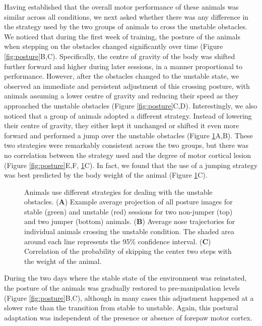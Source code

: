 Having established that the overall motor performance of these animals was similar across all conditions, we next asked whether there was any difference in the strategy used by the two groups of animals to cross the unstable obstacles. We noticed that during the first week of training, the posture of the animals when stepping on the obstacles changed significantly over time (Figure \ref{fig:posture}B,C). Specifically, the centre of gravity of the body was shifted further forward and higher during later sessions, in a manner proportional to performance. However, after the obstacles changed to the unstable state, we observed an immediate and persistent adjustment of this crossing posture, with animals assuming a lower centre of gravity and reducing their speed as they approached the unstable obstacles (Figure \ref{fig:posture}C,D). Interestingly, we also noticed that a group of animals adopted a different strategy. Instead of lowering their centre of gravity, they either kept it unchanged or shifted it even more forward and performed a jump over the unstable obstacles (Figure \ref{fig:jumping}A,B). These two strategies were remarkably consistent across the two groups, but there was no correlation between the strategy used and the degree of motor cortical lesion (Figure \ref{fig:posture}E,F, \ref{fig:jumping}C). In fact, we found that the use of a jumping strategy was best predicted by the body weight of the animal (Figure \ref{fig:jumping}C).

\begin{figure}
\centering

\caption{Animals use different strategies for dealing with the unstable obstacles. (\textbf{A}) Example average projection of all posture images for stable (green) and unstable (red) sessions for two non-jumper (top) and two jumper (bottom) animals. (\textbf{B}) Average nose trajectories for individual animals crossing the unstable condition. The shaded area around each line represents the 95\% confidence interval. (\textbf{C}) Correlation of the probability of skipping the center two steps with the weight of the animal.}
\label{fig:jumping}
\end{figure}

During the two days where the stable state of the environment was reinstated, the posture of the animals was gradually restored to pre-manipulation levels (Figure \ref{fig:posture}B,C), although in many cases this adjustment happened at a slower rate than the transition from stable to unstable. Again, this postural adaptation was independent of the presence or absence of forepaw motor cortex.

